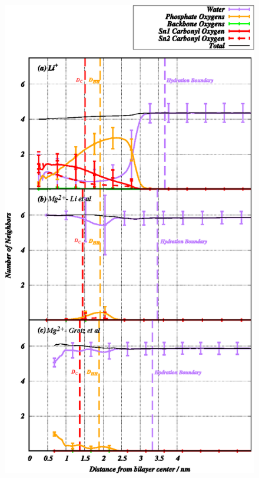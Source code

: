 \documentclass[journal=langd5,manuscript=article]{achemso}
\begin{document}
\begin{figure}
    \includegraphics[height=0.7\textheight]{Figure_7.eps}
\end{figure}
\clearpage
\end{document}
